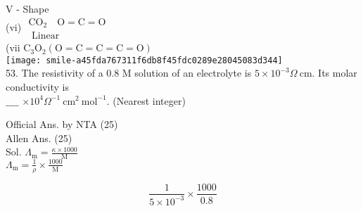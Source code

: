 \documentclass[10pt]{article}
\begin{document}
V - Shape\\
(vi) \(\begin{gathered}\mathrm{CO}_{2} \quad \mathrm{O}=\mathrm{C}=\mathrm{O} \\ \text { Linear }\end{gathered}\)\\
(vii \(\mathrm{C}_{3} \mathrm{O}_{2}(\mathrm{O}=\mathrm{C}=\mathrm{C}=\mathrm{C}=\mathrm{O})\)\\
\texttt{[image: smile-a45fda767311f6db8f45fdc0289e28045083d344]}\\
53. The resistivity of a 0.8 M solution of an electrolyte is \(5 \times 10^{-3} \Omega \mathrm{~cm}\). Its molar conductivity is\\
\(\_\_\_\_\) \(\times 10^{4} \Omega^{-1} \mathrm{~cm}^{2} \mathrm{~mol}^{-1}\). (Nearest integer)

Official Ans. by NTA (25)\\
Allen Ans. (25)\\
Sol. \(\Lambda_{\mathrm{m}}=\frac{\kappa \times 1000}{\mathrm{M}}\)\\
\(\Lambda_{\mathrm{m}}=\frac{1}{\rho} \times \frac{1000}{\mathrm{M}}\)

\[
\frac{1}{5 \times 10^{-3}} \times \frac{1000}{0.8}
\]
\end{document}
